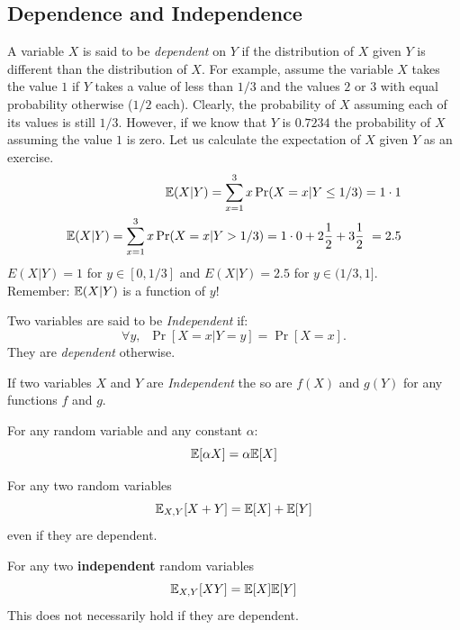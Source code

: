 \documentclass{article}
\begin{document}
\subsection{Dependence and Independence}
A variable $X$ is said to be {\it dependent} on $Y$ if the distribution of $X$ given $Y$ is different than the distribution of $X$. 
For example, assume the variable $X$ takes the value $1$ if $Y$ takes a
value of less than $1/3$ and the values $2$ or $3$ with equal probability otherwise ($1/2$ each).
%
Clearly, the probability of $X$ assuming each of its values is still
$1/3$. However, if we know that $Y$ is $0.7234$ the probability of
$X$ assuming the value $1$ is zero. Let us calculate the expectation of $X$ given $Y$ as an exercise.
\begin{eqnarray}
\E(X | Y) = \sum_{x=1}^{3} x \Pr(X = x | Y \le 1/3) = 1\cdot 1\\
\E(X | Y) = \sum_{x=1}^{3} x \Pr(X = x | Y > 1/3) = 1\cdot 0 + 2
\frac{1}{2} + 3\frac{1}{2}  = 2.5
\end{eqnarray}
$E(X | Y) = 1$ for $y \in [0,1/3]$ and $E(X | Y) = 2.5$ for $y \in (1/3,1]$.\\
Remember: ${\mathbb E}(X | Y)$ is a function of $y$!

\begin{definition}[Independence]
Two variables are said to be {\it Independent} if:
\[
\forall y,\;\;\Pr[ X=x | Y = y] = \Pr[X=x].
\]
They are {\it dependent} otherwise.
\end{definition}


\begin{fact}
If two variables $X$ and $Y$ are {\it Independent} the so are $f(X)$ and $g(Y)$ for any functions $f$ and $g$.
\end{fact}


\begin{fact}%
For any random variable and any constant $\alpha$:
\begin{equation}
{\mathbb E}[\alpha X] = \alpha {\mathbb E}[X]
\end{equation}
\end{fact}

\begin{fact}%
For any two random variables
\begin{equation}
{\mathbb E}_{X,Y}[X+Y] = {\mathbb E}[X] + {\mathbb E}[Y]
\end{equation}
even if they are dependent.
\end{fact}


\begin{fact}%
For any two {\bf independent} random variables
\begin{equation}
{\mathbb E}_{X,Y}[XY] = {\mathbb E}[X]{\mathbb E}[Y]
\end{equation}
This does not necessarily hold if they are dependent.
\end{fact}
\end{document}
